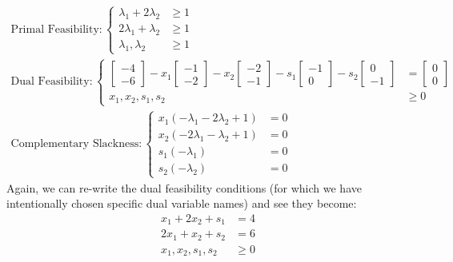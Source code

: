 \begin{gather*}
\text{Primal Feasibility}: \left\{
\begin{aligned}
\lambda_1 + 2\lambda_2 &\geq 1\\
2\lambda_1 + \lambda_2 &\geq 1\\
\lambda_1, \lambda_2 & \geq 1
\end{aligned}
\right.\\
\text{Dual Feasibility}:\left\{
\begin{aligned}
\begin{bmatrix}-4\\-6\end{bmatrix} - x_1\begin{bmatrix}-1\\-2\end{bmatrix} - 
x_2\begin{bmatrix}-2\\-1\end{bmatrix} -s_1\begin{bmatrix}-1\\0\end{bmatrix} - 
s_2\begin{bmatrix}0\\-1\end{bmatrix} &= \begin{bmatrix}0\\0\end{bmatrix}\\
x_1,x_2,s_1,s_2 & \geq 0
\end{aligned}
\right.\\
\text{Complementary Slackness}:\left\{
\begin{aligned}
x_1(-\lambda_1 - 2\lambda_2 + 1) &= 0\\
x_2(-2\lambda_1 - \lambda_2 + 1) &= 0\\
s_1(-\lambda_1) &= 0\\
s_2(-\lambda_2) &= 0
\end{aligned}
\right.
\end{gather*}
Again, we can re-write the dual feasibility conditions (for which we have intentionally chosen specific dual variable names) and see they become:
\begin{displaymath}
\begin{aligned}
x_1 + 2x_2 + s_1 &= 4\\
2x_1 + x_2 + s_2 & =6\\
x_1,x_2, s_1, s_2 &\geq 0
\end{aligned}
\end{displaymath}
